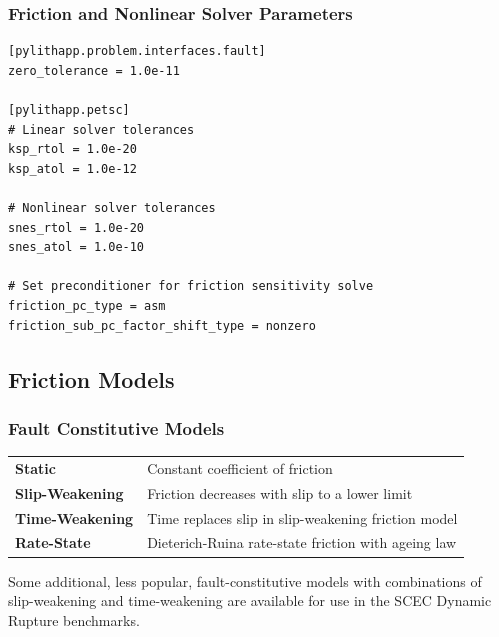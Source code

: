 \documentclass{beamer}
\begin{document}
\begin{frame}[fragile]
  \frametitle{Friction and Nonlinear Solver Parameters}

  \begin{verbatim}
[pylithapp.problem.interfaces.fault]
zero_tolerance = 1.0e-11

[pylithapp.petsc]
# Linear solver tolerances
ksp_rtol = 1.0e-20
ksp_atol = 1.0e-12

# Nonlinear solver tolerances
snes_rtol = 1.0e-20
snes_atol = 1.0e-10

# Set preconditioner for friction sensitivity solve
friction_pc_type = asm
friction_sub_pc_factor_shift_type = nonzero
\end{verbatim}
    
\end{frame}


\subsection{Friction Models}

\begin{frame}
  \frametitle{Fault Constitutive Models}

  \begin{tabular}{lp{3in}}
    {\bf\color{green} Static} & Constant coefficient of friction \\
    {\bf\color{green} Slip-Weakening} & Friction decreases with slip to a
    lower limit \\
    {\bf\color{green} Time-Weakening} & Time replaces slip in slip-weakening
    friction model \\
    {\bf\color{green} Rate-State} & Dieterich-Ruina rate-state friction with
    ageing law 
  \end{tabular}
  
  \vfill 
  Some additional, less popular, fault-constitutive models with
  combinations of slip-weakening and time-weakening are available for
  use in the SCEC Dynamic Rupture benchmarks. 
  \vfill

\end{frame}
\end{document}
